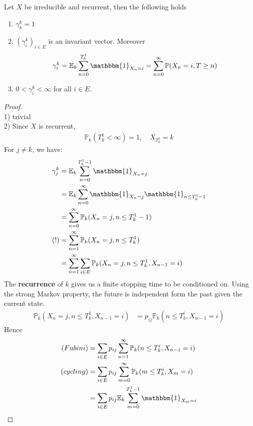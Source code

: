 \begin{lemma}
	Let $X$ be irreducible and recurrent, then the following holds
	\begin{enumerate}
		\item $\gamma_k^k = 1$
		\item $ (\gamma^k_i)_{i \in E}$ is an invariant vector. Moreover
		\begin{align*}
			\gamma_i^k = \mathbb{E}_k \sum_{n = 0}^{T_k^1} \mathbbm{1}_{X_n = i} = \sum_{n = 0}^\infty \mathbb{P}(X_n = i, T \geq n)
		\end{align*}
		\item $0 < \gamma_i^k < \infty$ for all $i \in E$.
	\end{enumerate}
\end{lemma}
\begin{proof}\quad\\
1) trivial\\
2) Since $X$ is recurrent, 
	\begin{align*}
		\mathbb{P}_k( T_k^1 < \infty ) = 1,\quad X_{T_k^1 } = k
	\end{align*}
	For $j \neq k$, we have:
	\begin{align*}
		\gamma_j^k &= \mathbb{E}_k \sum_{n = 0}^{T_k^1 -1} \mathbbm{1}_{X_n = j}\\
		&= \mathbb{E}_k \sum_{n = 0}^\infty \mathbbm{1}_{X_n = j} \mathbbm{1}_{n \le T_k^1 -1}\\
		&= \sum_{n = 0}^\infty \mathbb{P}_k(X_n = j, n \le T_k^1 -1)\\
	(!)	&= \sum_{n = 1}^\infty \mathbb{P}_k(X_n = j, n \le T_k^1 )\\
		&= \sum_{n = 1}^\infty \sum_{i \in E} \mathbb{P}_k(X_n = j, n \le T_k^1, X_{n-1} = i )
	\end{align*}
	The \textbf{recurrence }of $k$ gives us a finite stopping time to be conditioned on. Using the strong Markov property, the future is independent form the past given the current state.
	\begin{align*}
		\mathbb{P}_k(X_n = j, n \le T_k^1, X_{n-1} = i) &= p_{ij} \mathbb{P}_k(n \le T_k^i, X_{n-1} = i)
	\end{align*}
	Hence
	\begin{align*}
	(Fubini)	&= \sum_{i \in E} p_{ij} \sum_{n = 1}^\infty \mathbb{P}_k(n \le T_k^i, X_{n-1} = i)\\
	(cycling)	&= \sum_{i \in E} p_{ij} \sum_{m = 0}^\infty \mathbb{P}_k(m \le T_k^i, X_{m} = i)\\
		&= \sum_{i \in E} p_{ij} \mathbb{E}_k \sum_{m = 0}^{T_k^1 -1} \mathbbm{1}_{X_m = i}\\

\end{align*}
\end{proof}
